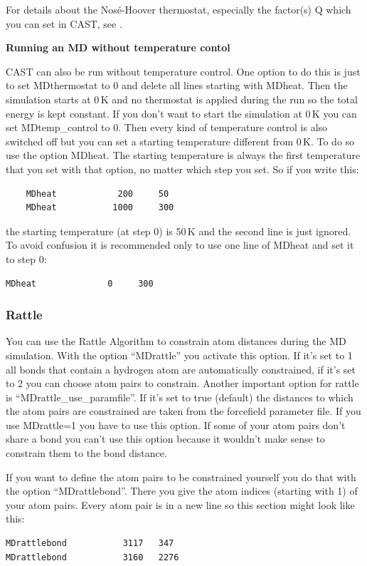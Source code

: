 \documentclass[10pt,a4paper]{article} %
\begin{document}
	For details about the Nosé-Hoover thermostat, especially the factor(s) Q which you can set in CAST, see \cite{frenkel_understanding_2001}.
	
\textbf{	Running an MD without temperature contol}
	
	\ac{CAST} can also be run without temperature control. One option to do this is just to set MDthermostat to 0 and delete all lines starting with MDheat. Then the simulation starts at 0\,K and no thermostat is applied during the run so the total energy is kept constant. If you don't want to start the simulation at 0\,K you can set MDtemp\_control to 0. Then every kind of temperature control is also switched off but you can set a starting temperature different from 0\,K. To do so use the option MDheat. The starting temperature is always the first temperature that you set with that option, no matter which step you set. So if you write this:
			\begin{lstlisting}
	MDheat			  200  	  50
	MDheat 			 1000     300
	\end{lstlisting}
	the starting temperature (at step 0) is 50\,K and the second line is just ignored. To avoid confusion it is recommended only to use one line of MDheat and set it to step 0:
\begin{lstlisting}
MDheat			    0  	  300
\end{lstlisting}	

\subsubsection{Rattle}

You can use the Rattle Algorithm\supercite{rattle} to constrain atom distances during the MD simulation. With the option ``MDrattle'' you activate this option. If it's set to 1 all bonds that contain a hydrogen atom are automatically constrained, if it's set to 2 you can choose atom pairs to constrain. Another important option for rattle is ``MDrattle\_use\_paramfile''. If it's set to true (default) the distances to which the atom pairs are constrained are taken from the forcefield parameter file. If you use MDrattle=1 you have to use this option. If some of your atom pairs don't share a bond you can't use this option because it wouldn't make sense to constrain them to the bond distance. 

If you want to define the atom pairs to be constrained yourself you do that with the option ``MDrattlebond''. There you give the atom indices (starting with 1) of your atom pairs. Every atom pair is in a new line so this section might look like this:
\begin{lstlisting}
MDrattlebond           3117   347
MDrattlebond           3160   2276
\end{lstlisting}
\end{document}
